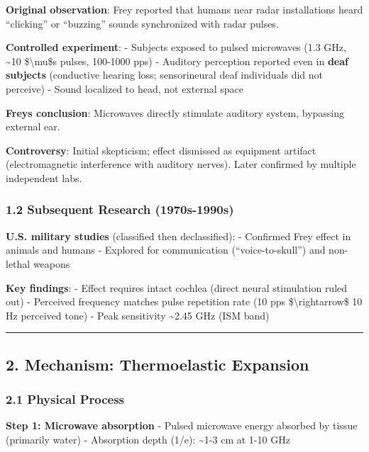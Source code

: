\textbf{Original observation}: Frey reported that humans near radar
installations heard ``clicking'' or ``buzzing'' sounds synchronized with
radar pulses.

\textbf{Controlled experiment}: - Subjects exposed to pulsed microwaves
(1.3 GHz, \textasciitilde10 \$\textbackslash mu\$s pulses, 100-1000 pps)
- Auditory perception reported even in \textbf{deaf subjects}
(conductive hearing loss; sensorineural deaf individuals did not
perceive) - Sound localized to head, not external space

\textbf{Frey\textquotesingle s conclusion}: Microwaves directly
stimulate auditory system, bypassing external ear.

\textbf{Controversy}: Initial skepticism; effect dismissed as equipment
artifact (electromagnetic interference with auditory nerves). Later
confirmed by multiple independent labs.

\subsubsection{1.2 Subsequent Research
(1970s-1990s)}\label{subsequent-research-1970s-1990s}

\textbf{U.S. military studies} (classified then declassified): -
Confirmed Frey effect in animals and humans - Explored for communication
(``voice-to-skull'') and non-lethal weapons

\textbf{Key findings}: - Effect requires intact cochlea (direct neural
stimulation ruled out) - Perceived frequency matches pulse repetition
rate (10 pps \$\textbackslash rightarrow\$ 10 Hz perceived tone) - Peak
sensitivity \textasciitilde2.45 GHz (ISM band)

\begin{center}\rule{0.5\linewidth}{0.5pt}\end{center}

\subsection{2. Mechanism: Thermoelastic
Expansion}\label{mechanism-thermoelastic-expansion}

\subsubsection{2.1 Physical Process}\label{physical-process}

\textbf{Step 1: Microwave absorption} - Pulsed microwave energy absorbed
by tissue (primarily water) - Absorption depth (1/e): \textasciitilde1-3
cm at 1-10 GHz


